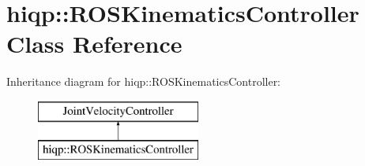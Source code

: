 \hypertarget{classhiqp_1_1ROSKinematicsController}{\section{hiqp\-:\-:R\-O\-S\-Kinematics\-Controller Class Reference}
\label{classhiqp_1_1ROSKinematicsController}
}
Inheritance diagram for hiqp\-:\-:R\-O\-S\-Kinematics\-Controller\-:\begin{figure}[H]
\begin{center}
\leavevmode
\includegraphics[height=2.000000cm]{classhiqp_1_1ROSKinematicsController}
\end{center}
\end{figure}
